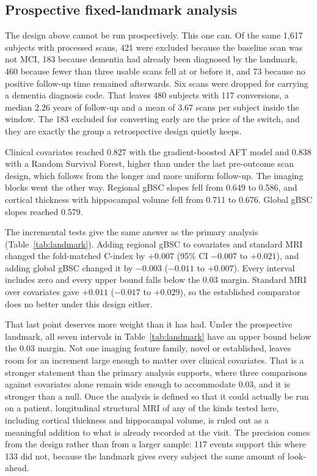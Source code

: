 \documentclass[blue]{ludusofficial}  %
\begin{document}
\subsection{Prospective fixed-landmark analysis}

The design above cannot be run prospectively. This one can. Of the same 1,617 subjects with processed scans, 421 were excluded because the baseline scan was not MCI, 183 because dementia had already been diagnosed by the landmark, 460 because fewer than three usable scans fell at or before it, and 73 because no positive follow-up time remained afterwards. Six scans were dropped for carrying a dementia diagnosis code. That leaves 480 subjects with 117 conversions, a median 2.26 years of follow-up and a mean of 3.67 scans per subject inside the window. The 183 excluded for converting early are the price of the switch, and they are exactly the group a retrospective design quietly keeps.

Clinical covariates reached 0.827 with the gradient-boosted AFT model and 0.838 with a Random Survival Forest, higher than under the last pre-outcome scan design, which follows from the longer and more uniform follow-up. The imaging blocks went the other way. Regional gBSC slopes fell from 0.649 to 0.586, and cortical thickness with hippocampal volume fell from 0.711 to 0.676. Global gBSC slopes reached 0.579.

The incremental tests give the same answer as the primary analysis (Table~\ref{tab:landmark}). Adding regional gBSC to covariates and standard MRI changed the fold-matched C-index by $+0.007$ (95\% CI $-0.007$ to $+0.021$), and adding global gBSC changed it by $-0.003$ ($-0.011$ to $+0.007$). Every interval includes zero and every upper bound falls below the 0.03 margin. Standard MRI over covariates gave $+0.011$ ($-0.017$ to $+0.029$), so the established comparator does no better under this design either.

That last point deserves more weight than it has had. Under the prospective landmark, all seven intervals in Table~\ref{tab:landmark} have an upper bound below the 0.03 margin. Not one imaging feature family, novel or established, leaves room for an increment large enough to matter over clinical covariates. That is a stronger statement than the primary analysis supports, where three comparisons against covariates alone remain wide enough to accommodate 0.03, and it is stronger than a null. Once the analysis is defined so that it could actually be run on a patient, longitudinal structural MRI of any of the kinds tested here, including cortical thickness and hippocampal volume, is ruled out as a meaningful addition to what is already recorded at the visit. The precision comes from the design rather than from a larger sample: 117 events support this where 133 did not, because the landmark gives every subject the same amount of look-ahead.
\end{document}

